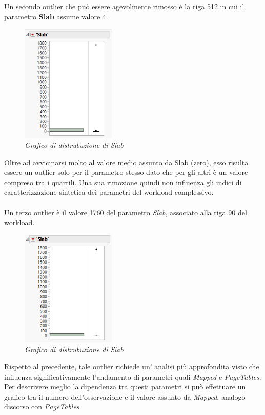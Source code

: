 \\
\vspace{0.5cm}
\\
Un secondo outlier che può essere agevolmente rimosso è la riga 512 in cui il parametro \textbf{Slab} assume valore 4. 
\begin{figure}[H]
	\centering
	\includegraphics[width=0.4\textwidth]{img/hw1/outlier_slab1.png}
	\caption{\textit{Grafico di distrubuzione di Slab}}
\end{figure}
Oltre ad avvicinarsi molto al valore medio assunto da Slab (zero), esso risulta essere un outlier solo per il parametro stesso dato che per gli altri è un valore compreso tra i quartili. Una sua rimozione quindi non influenza gli indici di caratterizzazione sintetica dei parametri del workload complessivo.
\\
\vspace{0.5cm}
\\
Un terzo outlier è il valore 1760 del parametro \textit{Slab}, associato alla riga 90 del workload.
\begin{figure}[H]
	\centering
	\includegraphics[width=0.4\textwidth]{img/hw1/outlier_slab2.png}
	\caption{\textit{Grafico di distrubuzione di Slab}}
\end{figure}
Rispetto al precedente, tale outlier richiede un' analisi più approfondita visto che influenza significativamente l'andamento di parametri quali \textit{Mapped} e \textit{PageTables}. Per descrivere meglio la dipendenza tra questi parametri si può effettuare un grafico tra il numero dell'osservazione e il valore assunto da \textit{Mapped}, analogo discorso con \textit{PageTables}.	
